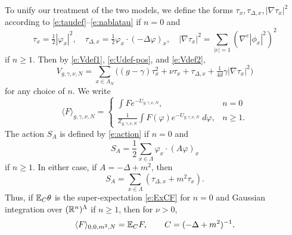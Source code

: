 To unify our treatment of the two models,
we define the forms $\tau_x, \tau_{\Delta,x}, |\nabla\tau_x|^2$ according
to \eqref{e:taudef}--\eqref{e:nablatau} if $n = 0$ and
\begin{equation}
\label{e:tauphi}
\tau_x = \tfrac{1}{2} |\varphi_x|^2,
	\quad
\tau_{\Delta,x} = \tfrac{1}{2} \varphi_x \cdot (-\Delta \varphi)_x,
	\quad
|\nabla\tau_x|^2 = \sum_{|e|=1} (\nabla^e |\phi_x|^2)^2
\end{equation}
if $n \ge 1$.
Then by \eqref{e:Vdef1}, \eqref{e:Udef-pos}, and \eqref{e:Vdef2},
\begin{equation}
V_{g,\gamma,\nu,N}
	=
\sum_{x\in\Lambda_N}
\Big(
	(g - \gamma) \tau_x^2 + \nu \tau_x + \tau_{\Delta,x} + \tfrac{1}{4 d} \gamma |\nabla\tau_x|^2
\Big)
\end{equation}
for any choice of $n$.
We write
\begin{equation}
\langle F \rangle_{g,\gamma,\nu,N}
	=
\begin{cases}
\displaystyle \int F e^{-U_{g,\gamma,\nu,N}},				& n = 0 \\
\displaystyle \frac{1}{Z_{g,\gamma,\nu,N}}
	\int F(\varphi) e^{-U_{g,\gamma,\nu,N}} \; d\varphi,	& n \ge 1.
\end{cases}
\end{equation}
The action $S_A$ is defined by \eqref{e:action} if $n = 0$ and
\begin{equation}
S_A = \frac12 \sum_{x\in\Lambda} \varphi_x \cdot (A \varphi)_x
\end{equation}
if $n \ge 1$. In either case, if $A = -\Delta + m^2$, then
\begin{equation}
\label{e:SAtauDelta}
S_A = \sum_{x\in\Lambda} (\tau_{\Delta,x} + m^2 \tau_x).
\end{equation}
Thus, if $\mathbb{E}_C \theta$ is the super-expectation \eqref{e:ExCF} for $n = 0$
and Gaussian integration over $({\mathbb R}^n)^\Lambda$ if $n \ge 1$,
then for $\nu > 0$,
\begin{equation}
\label{e:phi4-gauss}
\langle F \rangle_{0,0,m^2,N}
	=
\mathbb{E}_C F,
	\qquad
C = (-\Delta + m^2)^{-1}.
\end{equation}

